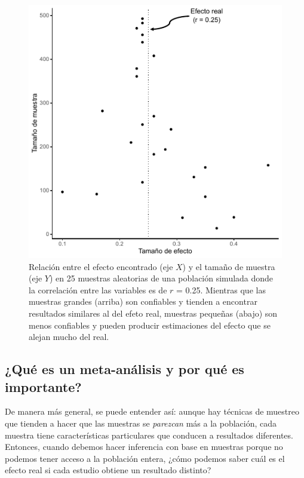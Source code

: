 \documentclass[
  bookmarksnumbered]{article}
\begin{document}
\begin{figure}

{\centering \includegraphics{images/dist-sim} 

}

\caption{Relación entre el efecto encontrado (eje $X$) y el tamaño de muestra (eje $Y$) en 25 muestras aleatorias de una población simulada donde la correlación entre las variables es de $r$ = 0.25. Mientras que las muestras grandes (arriba) son confiables y tienden a encontrar resultados similares al del efeto real, muestras pequeñas (abajo) son menos confiables y pueden producir estimaciones del efecto que se alejan mucho del real.}\label{fig:dist-sim}
\end{figure}

\hypertarget{quuxe9-es-un-meta-anuxe1lisis-y-por-quuxe9-es-importante}{%
\subsection{¿Qué es un meta-análisis y por qué es importante?}\label{quuxe9-es-un-meta-anuxe1lisis-y-por-quuxe9-es-importante}}

De manera más general, se puede entender así: aunque hay técnicas de muestreo que tienden a hacer que las muestras se \emph{parezcan} más a la población, cada muestra tiene características particulares que conducen a resultados diferentes. Entonces, cuando debemos hacer inferencia con base en muestras porque no podemos tener acceso a la población entera, ¿cómo podemos saber cuál es el efecto real si cada estudio obtiene un resultado distinto?
\end{document}
